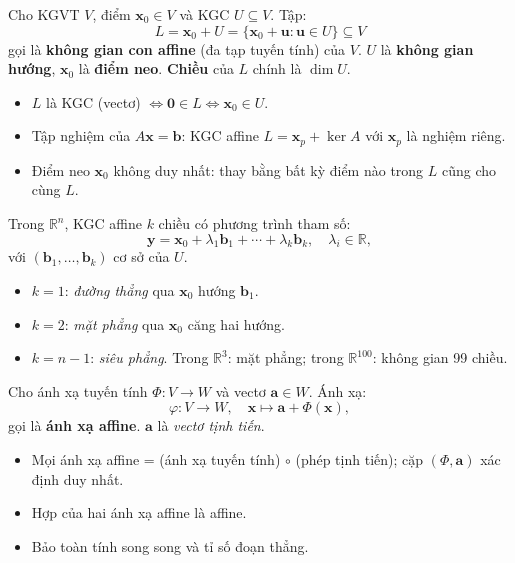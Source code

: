 \documentclass[12pt,a4paper]{article}
\begin{document}
\begin{dinhnghia}
  Cho KGVT $V$, điểm $\mathbf{x}_0 \in V$ và KGC $U \subseteq V$. Tập:
  \[
    L = \mathbf{x}_0 + U = \{\mathbf{x}_0 + \mathbf{u} : \mathbf{u} \in U\} \subseteq V
  \]
  gọi là \textbf{không gian con affine} (đa tạp tuyến tính) của $V$. $U$ là \textbf{không gian hướng}, $\mathbf{x}_0$ là \textbf{điểm neo}. \textbf{Chiều} của $L$ chính là $\dim U$.
\end{dinhnghia}

\begin{tinhchat}
\begin{itemize}
  \item $L$ là KGC (vectơ) $\Leftrightarrow \mathbf{0} \in L \Leftrightarrow \mathbf{x}_0 \in U$.
  \item Tập nghiệm của $A\mathbf{x} = \mathbf{b}$: KGC affine $L = \mathbf{x}_p + \ker A$ với $\mathbf{x}_p$ là nghiệm riêng.
  \item Điểm neo $\mathbf{x}_0$ không duy nhất: thay bằng bất kỳ điểm nào trong $L$ cũng cho cùng $L$.
\end{itemize}
\end{tinhchat}

\begin{vidu}[title={Đường, mặt phẳng, siêu phẳng affine}]
Trong $\mathbb{R}^n$, KGC affine $k$ chiều có phương trình tham số:
\[
  \mathbf{y} = \mathbf{x}_0 + \lambda_1 \mathbf{b}_1 + \cdots + \lambda_k \mathbf{b}_k,\quad \lambda_i \in \mathbb{R},
\]
với $(\mathbf{b}_1, \ldots, \mathbf{b}_k)$ cơ sở của $U$.
\begin{itemize}
  \item $k = 1$: \emph{đường thẳng} qua $\mathbf{x}_0$ hướng $\mathbf{b}_1$.
  \item $k = 2$: \emph{mặt phẳng} qua $\mathbf{x}_0$ căng hai hướng.
  \item $k = n-1$: \emph{siêu phẳng}. Trong $\mathbb{R}^3$: mặt phẳng; trong $\mathbb{R}^{100}$: không gian 99 chiều.
\end{itemize}
\end{vidu}

\begin{dinhnghia}[title={Ánh xạ affine}]
  Cho ánh xạ tuyến tính $\Phi: V \to W$ và vectơ $\mathbf{a} \in W$. Ánh xạ:
  \[
    \varphi: V \to W,\quad \mathbf{x} \mapsto \mathbf{a} + \Phi(\mathbf{x}),
  \]
  gọi là \textbf{ánh xạ affine}. $\mathbf{a}$ là \emph{vectơ tịnh tiến}.
\end{dinhnghia}

\begin{tinhchat}
\begin{itemize}
  \item Mọi ánh xạ affine = (ánh xạ tuyến tính) $\circ$ (phép tịnh tiến); cặp $(\Phi, \mathbf{a})$ xác định duy nhất.
  \item Hợp của hai ánh xạ affine là affine.
  \item Bảo toàn tính song song và tỉ số đoạn thẳng.
\end{itemize}
\end{tinhchat}
\end{document}
